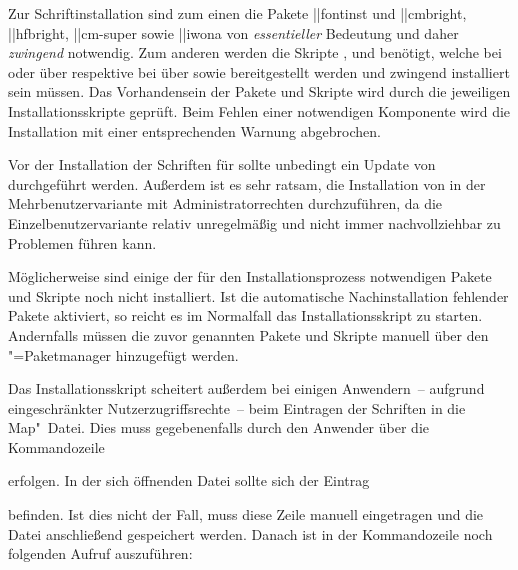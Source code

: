 %
Zur Schriftinstallation sind zum einen die Pakete \Package||{fontinst} und 
\Package||{cmbright}, \Package||{hfbright}, \Package||{cm-super} sowie 
\Package||{iwona} von \emph{essentieller} Bedeutung und daher \emph{zwingend} 
notwendig. Zum anderen werden die Skripte ,  und 
 benötigt, welche bei  oder 
 über  respektive bei
 über  sowie 
 bereitgestellt werden und zwingend installiert 
sein müssen. Das Vorhandensein der Pakete und Skripte wird durch die jeweiligen 
Installationsskripte geprüft. Beim Fehlen einer notwendigen Komponente wird die 
Installation mit einer entsprechenden Warnung abgebrochen.

%
Vor der Installation der Schriften für \TUDScript sollte unbedingt ein Update 
von  durchgeführt werden. Außerdem ist es sehr 
ratsam, die Installation von  in der 
Mehrbenutzervariante mit Administratorrechten durchzuführen, da die 
Einzelbenutzervariante relativ unregelmäßig und nicht immer nachvollziehbar zu 
Problemen führen kann. 

Möglicherweise sind einige der für den Installationsprozess notwendigen Pakete 
und Skripte noch nicht installiert. Ist die automatische Nachinstallation 
fehlender Pakete aktiviert, so reicht es im Normalfall das Installationsskript 
zu starten. Andernfalls müssen die zuvor genannten Pakete und Skripte manuell 
über den "=Paketmanager hinzugefügt werden.

Das Installationsskript scheitert außerdem bei einigen Anwendern~-- aufgrund 
eingeschränkter Nutzerzugriffsrechte~-- beim Eintragen der Schriften in die 
Map"~Datei. Dies muss gegebenenfalls durch den Anwender über die Kommandozeile 
%
\begin{quoting}
\end{quoting}
%
erfolgen. In der sich öffnenden Datei sollte sich der Eintrag 
\begin{quoting}
\end{quoting}
befinden. Ist dies nicht der Fall, muss diese Zeile manuell eingetragen und die 
Datei anschließend gespeichert werden. Danach ist in der Kommandozeile noch 
folgenden Aufruf auszuführen:
%
\begin{quoting}
\end{quoting}


